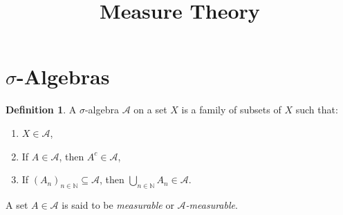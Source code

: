\documentclass{article}
\title{\textbf{Measure Theory}\\[0.5em]}
\author{}
\date{}
\theoremstyle{definition}
\newtheorem{definition}{Definition}[section]
\begin{document}
\maketitle

\section{$\sigma$-Algebras}
\begin{definition}
A $\sigma$-algebra $\mathcal{A}$ on a set $X$ is a family of subsets of $X$ such that:
\begin{enumerate}
    \item $X \in \mathcal{A}$,
    \item If $A \in \mathcal{A}$, then $A^c \in \mathcal{A}$,
    \item If $(A_n)_{n \in \mathbb{N}} \subseteq \mathcal{A}$, then $\bigcup_{n \in \mathbb{N}} A_n \in \mathcal{A}$.
\end{enumerate}

\medskip

A set $A \in \mathcal{A}$ is said to be \textit{measurable} or \textit{$\mathcal{A}$-measurable}.
\end{definition}
\end{document}
